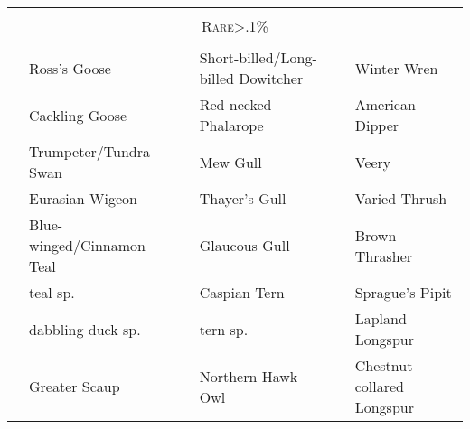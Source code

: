 \documentclass{article}
\begin{document}
\begin{center}
 
\begin{tabularx}{\textwidth}{cXcXcX} 
\hline
\\
\multicolumn{6}{c}{\textsc{ \Large{Rare\footnotesize{>.1\%}}}} \\ 
\\
\hline
\underline{\hspace{3ex}} 	 &Ross's Goose 	 &\underline{\hspace{3ex}} 	 &Short-billed/Long-billed Dowitcher 	 &\underline{\hspace{3ex}} 	 &Winter Wren \\ 
\underline{\hspace{3ex}} 	 &Cackling Goose 	 &\underline{\hspace{3ex}} 	 &Red-necked Phalarope 	 &\underline{\hspace{3ex}} 	 &American Dipper \\ 
\underline{\hspace{3ex}} 	 &Trumpeter/Tundra Swan 	 &\underline{\hspace{3ex}} 	 &Mew Gull 	 &\underline{\hspace{3ex}} 	 &Veery \\ 
\underline{\hspace{3ex}} 	 &Eurasian Wigeon 	 &\underline{\hspace{3ex}} 	 &Thayer's Gull 	 &\underline{\hspace{3ex}} 	 &Varied Thrush \\ 
\underline{\hspace{3ex}} 	 &Blue-winged/Cinnamon Teal 	 &\underline{\hspace{3ex}} 	 &Glaucous Gull 	 &\underline{\hspace{3ex}} 	 &Brown Thrasher \\ 
\underline{\hspace{3ex}} 	 &teal sp. 	 &\underline{\hspace{3ex}} 	 &Caspian Tern 	 &\underline{\hspace{3ex}} 	 &Sprague's Pipit \\ 
\underline{\hspace{3ex}} 	 &dabbling duck sp. 	 &\underline{\hspace{3ex}} 	 &tern sp. 	 &\underline{\hspace{3ex}} 	 &Lapland Longspur \\ 
\underline{\hspace{3ex}} 	 &Greater Scaup 	 &\underline{\hspace{3ex}} 	 &Northern Hawk Owl 	 &\underline{\hspace{3ex}} 	 &Chestnut-collared Longspur \\ 

\end{tabularx}
\end{center}
\end{document}
